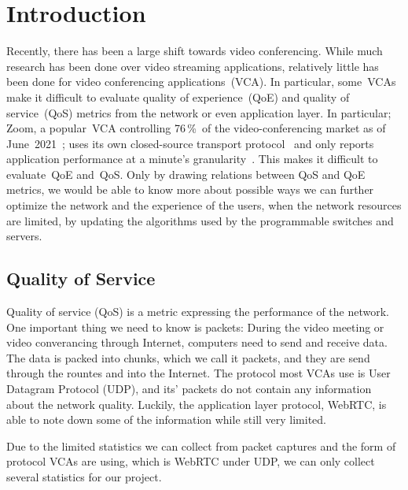 \section{Introduction}\label{introduction}
    Recently, there has been a large shift towards video conferencing. While much research has been done over video streaming applications, relatively little has been done for video conferencing applications~(VCA). In particular, some~VCAs make it difficult to evaluate quality of experience~(QoE) and quality of service~(QoS) metrics from the network or even application layer. In particular; Zoom, a popular~VCA controlling 76\,\%~of the video-conferencing market as of June~2021~\autocite{kim2021}; uses its own closed-source transport protocol~\autocite{marczak2020} and only reports application performance at a minute's granularity~\autocite{walia2019}. This makes it difficult to evaluate~QoE and~QoS. Only by drawing relations between QoS and QoE metrics, we would be able to know more about possible ways we can further optimize the network and the experience of the users, when the network resources are limited, by updating the algorithms used by the programmable switches and servers. 

    \subsection{Quality of Service}\label{introduction:qos}
        Quality of service (QoS) is a metric expressing the performance of the network. One important thing we need to know is packets: During the video meeting or video converancing through Internet, computers need to send and receive data. The data is packed into chunks, which we call it packets, and they are send through the rountes and into the Internet. The protocol most VCAs use is User Datagram Protocol (UDP), and its' packets do not contain any information about the network quality. Luckily, the application layer protocol, WebRTC, is able to note down some of the information while still very limited.
        
        Due to the limited statistics we can collect from packet captures and the form of protocol VCAs are using, which is WebRTC under UDP, we can only collect several statistics for our project. 

